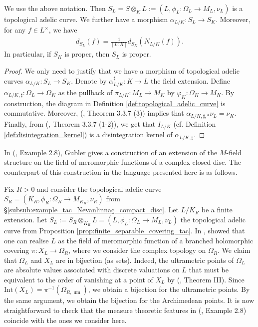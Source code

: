 \documentclass [11pt,reqno]{amsart}
\newcommand{\1}{\mathmybb{1}}
\def\um{\operatorname{um}}
\begin{document}
\begin{proposition}
\label{prop:finite_separable_covering_tac}
We use the above notation. Then $S_L = S \otimes_K L := (L,\phi_L : \Omega_L \to M_L,\nu_L)$ is a topological adelic curve. We further have a morphism $\alpha_{L/K}: S_L \to S_K$. Moreover, for any $f\in L^{\times}$, we have
\begin{align}
\label{eq:product_formula_finite_separable_extension_tac}
d_{S_L}(f) = \frac{1}{[L:K]} d_{S_K}(N_{L/K}(f)).
\end{align}
In particular, if $S_K$ is proper, then $S_L$ is proper.
\end{proposition}

\begin{proof}
We only need to justify that we have a morphism of topological adelic curves $\alpha_{L/K} : S_L \to S_K$. Denote by $\alpha_{L/K}^{\sharp} : K \to L$ the field extension. Define $\alpha_{L/K,\sharp} : \Omega_L \to \Omega_K$ as the pullback of $\pi_{L/K}:M_L \to M_K$ by $\varphi_K : \Omega_K \to M_K$. By construction, the diagram in Definition \ref{def:topological_adelic_curve} is commutative. Moreover, (\cite{ChenMori}, Theorem 3.3.7 (3)) implies that $\alpha_{L/K,\sharp,\ast} \nu_L = \nu_K$. Finally, from (\cite{ChenMori}, Theorem 3.3.7 (1-2)), we get that $I_{L/K}$ (cf. Definition \ref{def:disintegration_kernel}) is a disintegration kernel of $\alpha_{L/K,\sharp}$.
\end{proof}

\begin{example}
\label{example:finite_separable_covering_Gubler}
In (\cite{Gubler97}, Example 2.8), Gubler gives a construction of an extension of the $M$-field structure on the field of meromorphic functions of a complex closed disc. The counterpart of this construction in the language presented here is as follows. 

Fix $R>0$ and consider the topological adelic curve $S_{R}=(K_{R},\phi_{R}:\Omega_{R}\to M_{K_{R}},\nu_{R})$ from \S \ref{subsub:example_tac_Nevanlinnaç_compact_disc}. Let $L/K_{R}$ be a finite extension. Let $S_{L}:= S_{R}\otimes_{K_{R}}L = (L,\phi_{L}:\Omega_{L}\to M_{L},\nu_{L})$ the topological adelic curve from Proposition \ref{prop:finite_separable_covering_tac}. In \cite{Gubler97}, showed that one can realise $L$ as the field of meromorphic function of a branched holomorphic covering $\pi: X_{L}\to \Omega_{R}$, where we consider the complex topology on $\Omega_{R}$. We claim that $\Omega_{L}$ and $X_{L}$ are in bijection (as sets). Indeed, the ultrametric points of $\Omega_{L}$ are absolute values associated with discrete valuations on $L$ that must be equivalent to the order of vanishing at a point of $X_{L}$ by (\cite{Isssa66}, Theorem III). Since $\mathrm{Int}(X_{L})=\pi^{-1}(\Omega_{R,\um})$, we obtain a bijection for the ultrametric points. By the same argument, we obtain the bijection for the Archimedean points. It is now straightforward to check that the measure theoretic features in (\cite{Gubler97}, Example 2.8) coincide with the ones we consider here.
\end{example}
\end{document}
